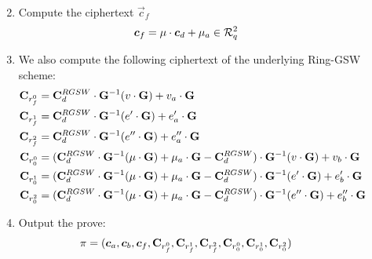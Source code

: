 \begin{description}
\begin{enumerate}
\begin{align*}
    \end{align*}
  \item Compute the ciphertext $\vec{c}_f$
    \begin{align*}
      \vec{c}_f &= \mu \cdot \vec{c}_d + \mu_a \in \R_q^2
    \end{align*}
  \item We also compute the following ciphertext of the underlying Ring-GSW scheme:
    \begin{align*}
      \mathbf{C}_{r_f^0} &= \mathbf{C}_d^{RGSW} \cdot \mathbf{G}^{-1}(v \cdot \mathbf{G}) + v_a \cdot \mathbf{G} \\
      \mathbf{C}_{r_f^1} &= \mathbf{C}_d^{RGSW} \cdot \mathbf{G}^{-1}(e' \cdot \mathbf{G}) + e_a' \cdot \mathbf{G} \\
      \mathbf{C}_{r_f^2} &= \mathbf{C}_d^{RGSW} \cdot \mathbf{G}^{-1}(e'' \cdot \mathbf{G}) + e_a'' \cdot \mathbf{G} \\
      \mathbf{C}_{r_0^0} &= (\mathbf{C}_d^{RGSW} \cdot \mathbf{G}^{-1}(\mu \cdot \mathbf{G}) + \mu_a \cdot \mathbf{G} - \mathbf{C}_d^{RGSW}) \cdot \mathbf{G}^{-1}(v \cdot \mathbf{G}) + v_b \cdot \mathbf{G} \\
      \mathbf{C}_{r_0^1} &= (\mathbf{C}_d^{RGSW} \cdot \mathbf{G}^{-1}(\mu \cdot \mathbf{G}) + \mu_a \cdot \mathbf{G} - \mathbf{C}_d^{RGSW}) \cdot \mathbf{G}^{-1}(e' \cdot \mathbf{G}) + e_b' \cdot \mathbf{G} \\
      \mathbf{C}_{r_0^2} &= (\mathbf{C}_d^{RGSW} \cdot \mathbf{G}^{-1}(\mu \cdot \mathbf{G}) + \mu_a \cdot \mathbf{G} - \mathbf{C}_d^{RGSW}) \cdot \mathbf{G}^{-1}(e'' \cdot \mathbf{G}) + e_b'' \cdot \mathbf{G} \\
    \end{align*}
  \item Output the prove:
    \begin{align*}
      \pi &= (\vec{c}_a, \vec{c}_b, \vec{c}_f, \mat{C}_{r_f^0}, \mat{C}_{r_f^1}, \mat{C}_{r_f^2}, \mat{C}_{r_0^0}, \mat{C}_{r_0^1}, \mat{C}_{r_0^2}) 
    \end{align*}
  \end{enumerate}


\end{description}
